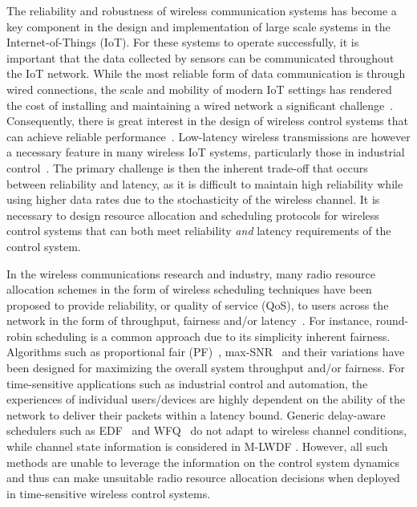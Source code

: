 The reliability and robustness of wireless communication systems has become a key component in the design and implementation of large scale systems in the Internet-of-Things (IoT). For these systems to operate successfully, it is important that the data collected by sensors can be communicated throughout the IoT network. While the most reliable form of data communication is through wired connections, the scale and mobility of modern IoT settings has rendered the cost of installing and maintaining a wired network a significant challenge~\cite{wollschlaeger2017future}. Consequently, there is great interest in the design of wireless control systems that can achieve reliable performance~\cite{varghese2014wireless, li2017review}. Low-latency wireless transmissions are however a necessary feature in many wireless IoT systems, particularly those in industrial control~\cite{varghese2014wireless,popovski2018wireless, bennis2018ultra}.  The primary challenge is then the inherent trade-off that occurs between reliability and latency, as it is difficult to maintain high reliability while using higher data rates due to the stochasticity of the wireless channel. It is necessary to design resource allocation and scheduling protocols for wireless control systems that can both meet reliability \emph{and} latency requirements of the control system.



In the wireless communications research and industry, many radio resource allocation schemes in the form of wireless scheduling techniques have been proposed to provide reliability, or quality of service (QoS), to users across the network in the form of throughput, fairness and/or latency~\cite{cao2001scheduling,wongthavarawat2003packet,fattah2002overview,yaacoub2012survey}. For instance, round-robin scheduling is a common approach due to its simplicity inherent fairness. Algorithms such as proportional fair (PF)~\cite{kim2005proportional}, max-SNR~\cite{knopp1995information} and their variations have been designed for maximizing the overall system throughput and/or fairness. For time-sensitive applications such as industrial control and automation, the experiences of individual users/devices are highly dependent on the ability of the network to deliver their packets within a latency bound. Generic delay-aware schedulers such as EDF~\cite{wu2014analysis} and WFQ~\cite{lu1999fair} do not adapt to wireless channel conditions, while channel state information is considered in M-LWDF \cite{andrews2001providing}. However, all such methods are unable to leverage the information on the control system dynamics and thus can make unsuitable radio resource allocation decisions when deployed in time-sensitive wireless control systems.


